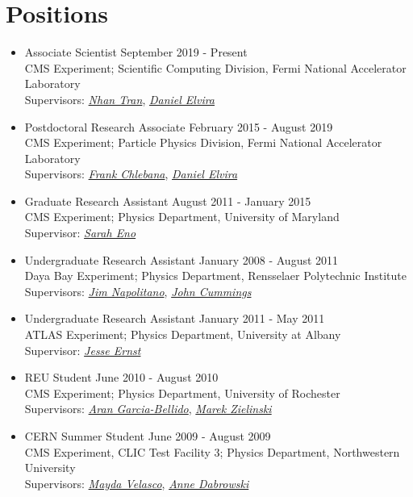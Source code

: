 \section{Positions}
\begin{itemize}[leftmargin=12pt]
\item Associate Scientist \hfill September 2019 - Present\\
CMS Experiment; Scientific Computing Division, Fermi National Accelerator Laboratory \\
Supervisors: {\sl \href{mailto:ntran@fnal.gov}{Nhan Tran}}, {\sl \href{mailto:daniel@fnal.gov}{Daniel Elvira}}
\item Postdoctoral Research Associate \hfill February 2015 - August 2019 \\
CMS Experiment; Particle Physics Division, Fermi National Accelerator Laboratory \\
Supervisors: {\sl \href{mailto:chlebana@fnal.gov}{Frank Chlebana}}, {\sl \href{mailto:daniel@fnal.gov}{Daniel Elvira}}
\item Graduate Research Assistant \hfill August 2011 - January 2015 \\
CMS Experiment; Physics Department, University of Maryland \\
Supervisor: {\sl \href{mailto:eno@umd.edu}{Sarah Eno}}
\item Undergraduate Research Assistant \hfill January 2008 - August 2011 \\
Daya Bay Experiment; Physics Department, Rensselaer Polytechnic Institute \\
Supervisors: {\sl \href{mailto:napolj@rpi.edu}{Jim Napolitano}}, {\sl \href{mailto:cummij@rpi.edu}{John Cummings}}
\item Undergraduate Research Assistant \hfill January 2011 - May 2011 \\
ATLAS Experiment; Physics Department, University at Albany \\
Supervisor: {\sl \href{mailto:jae@albany.edu}{Jesse Ernst}}
\item REU Student \hfill June 2010 - August 2010 \\
CMS Experiment; Physics Department, University of Rochester \\
Supervisors: {\sl \href{mailto:aran@pas.rochester.edu}{Aran Garcia-Bellido}}, {\sl \href{mailto:marek@fnal.gov}{Marek Zielinski}}
\item CERN Summer Student \hfill June 2009 - August 2009 \\
CMS Experiment, CLIC Test Facility 3; Physics Department, Northwestern University \\
Supervisors: {\sl \href{mailto:mayda.velasco@cern.ch}{Mayda Velasco}}, {\sl \href{mailto:anne.dabrowski@cern.ch}{Anne Dabrowski}}
\end{itemize}
